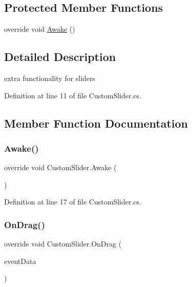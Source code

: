 \subsection*{Protected Member Functions}
\begin{DoxyCompactItemize}
\item 
override void \mbox{\hyperlink{class_custom_slider_ae5b856b8b20c6a0e753fefa152865773}{Awake}} ()
\end{DoxyCompactItemize}


\subsection{Detailed Description}
extra functionality for sliders 



Definition at line 11 of file Custom\+Slider.\+cs.



\subsection{Member Function Documentation}
\mbox{\label{class_custom_slider_ae5b856b8b20c6a0e753fefa152865773}} 
\subsubsection{\texorpdfstring{Awake()}{Awake()}}
{\footnotesize\ttfamily override void Custom\+Slider.\+Awake (\begin{DoxyParamCaption}{ }\end{DoxyParamCaption})\hspace{0.3cm}{\ttfamily [protected]}}



Definition at line 17 of file Custom\+Slider.\+cs.

\mbox{\label{class_custom_slider_a1368481d25207b7ae658a6cc7a926b3e}} 
\subsubsection{\texorpdfstring{On\+Drag()}{OnDrag()}}
{\footnotesize\ttfamily override void Custom\+Slider.\+On\+Drag (\begin{DoxyParamCaption}\item[{Pointer\+Event\+Data}]{event\+Data }\end{DoxyParamCaption})}



